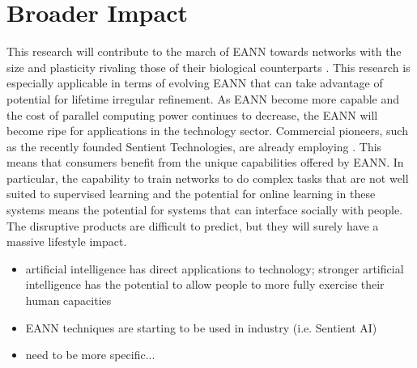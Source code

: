 \section{Broader Impact}

This research will contribute to the march of EANN towards networks with the size and plasticity rivaling those of their biological counterparts \cite{Clune2011OnRegularity,Tonelli2013OnNetworks}. This research is especially applicable in terms of evolving EANN that can take advantage of potential for lifetime irregular refinement. As EANN become more capable and the cost of parallel computing power continues to decrease, the EANN will become ripe for applications in the technology sector. Commercial pioneers, such as the recently founded Sentient Technologies, are already employing . This means that consumers benefit from the unique capabilities offered by EANN. In particular, the capability to train networks to do complex tasks that are not well suited to supervised learning and the potential for online learning in these systems  \cite{Downing2015IntelligenceSystems} means the potential for systems that can interface socially with people. The disruptive products are difficult to predict, but they will surely have a massive lifestyle impact.

\begin{itemize}
  \item artificial intelligence has direct applications to technology; stronger artificial intelligence has the potential to allow people to more fully exercise their human capacities
  \item EANN techniques are starting to be used in industry (i.e. Sentient AI)
  \item need to be more specific...
\end{itemize}